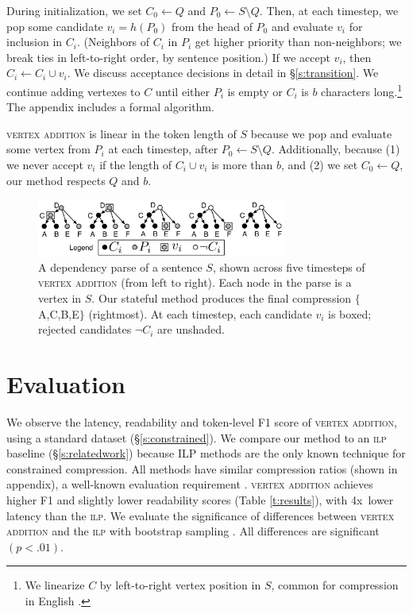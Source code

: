 \documentclass[11pt,a4paper]{article}
\newcommand{\speedup}[0]{4x~}
\begin{document}
During initialization, we set $C_0 \gets Q$ and $P_0 \gets S \setminus Q$. Then, at each timestep, we pop some candidate $v_i =h(P_0)$ from the head of $P_0$ and evaluate $v_i$ for inclusion in $C_i$. (Neighbors of $C_i$ in $P_i$ get higher priority than non-neighbors; we break ties in left-to-right order, by sentence position.) If we accept $v_i$, then $C_i \gets C_i \cup v_i$. We discuss acceptance decisions in detail in \S\ref{s:transition}. We continue adding vertexes to $C$ until either $P_i$ is empty or $C_i$ is $b$ characters long.\footnote{We linearize $C$ by left-to-right vertex position in $S$, common for compression in English \cite{filippova2013overcoming}.} The appendix includes a formal algorithm. 

\textsc{vertex addition} is linear in the token length of $S$ because we pop and evaluate some vertex from $P_i$ at each timestep, after $P_0  \gets S \setminus Q$. Additionally, because (1) we never accept $v_i$ if the length of $C_i \cup v_i$ is more than $b$, and (2) we set $C_0 \gets Q$, our method respects $Q$ and $b$.

\begin{figure}[h]
\includegraphics[width=8.2cm]{additive.pdf}
\caption{A dependency parse of a sentence $S$, shown across five timesteps of \textsc{vertex addition} (from left to right). Each node in the parse is a vertex in $S$. Our stateful method produces the final compression $\{$A,C,B,E$\}$ (rightmost). At each timestep, each candidate $v_i$ is boxed; rejected candidates $\neg C_i$ are unshaded.}
\label{f:walkthru}
\end{figure}

\section{Evaluation}\label{s:autoeval}

We observe the latency, readability and token-level F1 score of \textsc{vertex addition}, using a standard dataset (\S\ref{s:constrained}).
We compare our method to an \textsc{ilp} baseline (\S\ref{s:relatedwork}) because ILP methods are the only known technique for constrained compression. All methods have similar compression ratios (shown in appendix), a well-known evaluation requirement \cite{napoles2011evaluating}. 
\textsc{vertex addition} achieves higher F1 and slightly lower readability scores (Table \ref{t:results}), with \speedup lower latency  than the \textsc{ilp}. We evaluate the significance of differences between \textsc{vertex addition} and the \textsc{ilp} with bootstrap sampling \cite{D12-1091}. All differences are significant {\small $(p < .01)$}. 
\end{document}
